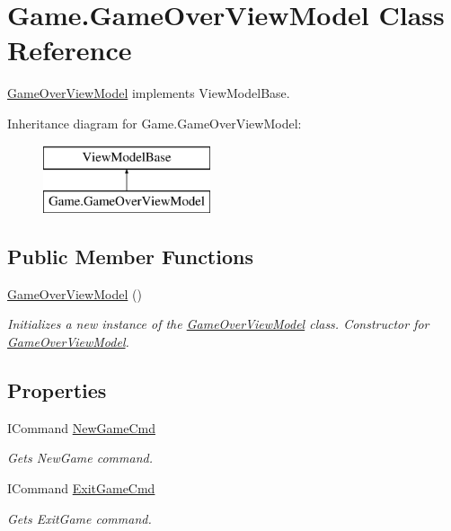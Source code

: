 \hypertarget{class_game_1_1_game_over_view_model}{}\section{Game.\+Game\+Over\+View\+Model Class Reference}
\label{class_game_1_1_game_over_view_model}


\mbox{\hyperlink{class_game_1_1_game_over_view_model}{Game\+Over\+View\+Model}} implements View\+Model\+Base.  


Inheritance diagram for Game.\+Game\+Over\+View\+Model\+:\begin{figure}[H]
\begin{center}
\leavevmode
\includegraphics[height=2.000000cm]{class_game_1_1_game_over_view_model}
\end{center}
\end{figure}
\subsection*{Public Member Functions}
\begin{DoxyCompactItemize}
\item 
\mbox{\hyperlink{class_game_1_1_game_over_view_model_a3e1275ccdb9f4b441759cfaf572ca5d8}{Game\+Over\+View\+Model}} ()
\begin{DoxyCompactList}\small\item\em Initializes a new instance of the \mbox{\hyperlink{class_game_1_1_game_over_view_model}{Game\+Over\+View\+Model}} class. Constructor for \mbox{\hyperlink{class_game_1_1_game_over_view_model}{Game\+Over\+View\+Model}}. \end{DoxyCompactList}\end{DoxyCompactItemize}
\subsection*{Properties}
\begin{DoxyCompactItemize}
\item 
I\+Command \mbox{\hyperlink{class_game_1_1_game_over_view_model_a01f8af5bc33f89150c7bbcda1370b41f}{New\+Game\+Cmd}}
\begin{DoxyCompactList}\small\item\em Gets New\+Game command. \end{DoxyCompactList}\item 
I\+Command \mbox{\hyperlink{class_game_1_1_game_over_view_model_a473a16497d7858b4dc1243cf8a55059e}{Exit\+Game\+Cmd}}
\begin{DoxyCompactList}\small\item\em Gets Exit\+Game command. \end{DoxyCompactList}\end{DoxyCompactItemize}


